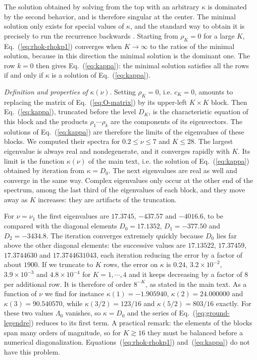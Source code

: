 The solution obtained by solving from the top with an arbitrary $\kappa$ is dominated by the second behavior, and is therefore singular at the center. The minimal solution only exists for special values of $\kappa$, and the standard way to obtain it is precisely to run the recurrence backwards \cite{Gautschi67}. Starting from $\rho_K = 0$ for a large $K$, Eq.~(\ref{eq:rhok-rhokp1}) converges when $K \to \infty$ to the ratios of the minimal solution, because in this direction the minimal solution is the dominant one. The row $k = 0$ then gives Eq.~(\ref{eq:kappa}): the minimal solution satisfies all the rows if and only if $\kappa$ is a solution of Eq.~(\ref{eq:kappa}).

\emph{Definition and properties of $\kappa(\nu)$.} Setting $\rho_K = 0$, i.e. $c_K = 0$, amounts to replacing the matrix of Eq.~(\ref{eq:O-matrix}) by its upper-left $K \times K$ block. Then Eq.~(\ref{eq:kappa}), truncated before the level $D_K$, is the characteristic equation of this block and the products $\rho_1 \cdots \rho_k$ are the components of its eigenvectors. The solutions of Eq.~(\ref{eq:kappa}) are therefore the limits of the eigenvalues of these blocks. We computed their spectra for $0.2 \leq \nu \leq 7$ and $K \leq 28$. The largest eigenvalue is always real and nondegenerate, and it converges rapidly with $K$. Its limit is the function $\kappa(\nu)$ of the main text, i.e. the solution of Eq.~(\ref{eq:kappa}) obtained by iteration from $\kappa = D_0$. The next eigenvalues are real as well and converge in the same way. Complex eigenvalues only occur at the other end of the spectrum, among the last third of the eigenvalues of each block, and they move away as $K$ increases: they are artifacts of the truncation.

For $\nu = \nu_1$ the first eigenvalues are $17.3745$, $-437.57$ and $-4016.6$, to be compared with the diagonal elements $D_0 = 17.1352$, $D_1 = -377.50$ and $D_2 = -3434.8$. The iteration converges extremely quickly because $D_0$ lies far above the other diagonal elements: the successive values are $17.13522$, $17.37459$, $17.3744630$ and $17.3744631043$, each iteration reducing the error by a factor of about $1900$. If we truncate to $K$ rows, the error on $\kappa$ is $0.24$, $3.2 \times 10^{-2}$, $3.9 \times 10^{-3}$ and $4.8 \times 10^{-4}$ for $K = 1, \cdots, 4$ and it keeps decreasing by a factor of $8$ per additional row. It is therefore of order $8^{-K}$, as stated in the main text. As a function of $\nu$ we find for instance $\kappa(1) = -1.905940$, $\kappa(2) = 24.000000$ and $\kappa(3) = 90.540570$, while $\kappa(3/2) = 123/16$ and $\kappa(5/2) = 803/16$ exactly. For these two values $\Lambda_0$ vanishes, so $\kappa = D_0$ and the series of Eq.~(\ref{eq:ground-legendre}) reduces to its first term. A practical remark: the elements of the blocks span many orders of magnitude, so for $K \gtrsim 16$ they must be balanced before a numerical diagonalization. Equations~(\ref{eq:rhok-rhokp1}) and~(\ref{eq:kappa}) do not have this problem.

